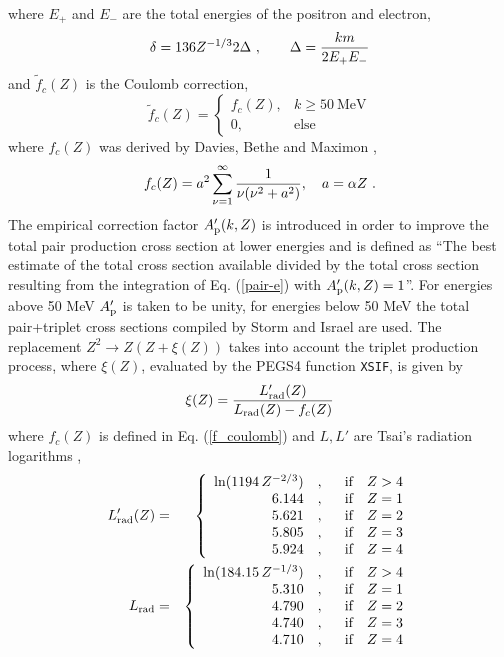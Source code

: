 where $E_+$ and $E_-$ are the total energies of the 
positron and electron, 
\begin{equation}
\delta = 136 Z^{-1/3} 2 \Delta~,\quad \quad \Delta = {k m \over 2 E_+ E_-}
\end{equation}
and $\tilde{f}_c(Z)$ is the Coulomb correction,
\begin{equation}
\label{f_coulomb}
\tilde{f}_c(Z) =  
\begin{cases}
f_c(Z), & k \ge 50~\text{MeV} \\
0, & \text{else}
\end{cases}
\end{equation}
where $f_c(Z)$ was derived by 
Davies, Bethe and Maximon \cite{Da54},
\begin{equation}
\label{f_coulomb1}
f_c(Z) = a^2 \sum_{\nu=1}^\infty {1 \over \nu (\nu^2 + a^2)}, \quad 
a = \alpha Z~.
\end{equation} 
The empirical correction factor $A_{\rm p}'(k,Z)$ is 
introduced in order to improve the total pair production 
cross section at lower energies and is defined 
as ``The best estimate of the total cross section 
available divided by the total cross section resulting 
from the integration of Eq. (\ref{pair-e}) with 
$A_{\rm p}'(k,Z)=1$''. For energies above 
50 MeV $A_{\rm p}'$ is taken to be unity, for 
energies below 50 MeV the total pair+triplet cross sections compiled 
by Storm and Israel \cite{SI70} are used.
The replacement $Z^2 \to Z (Z + \xi(Z))$ takes 
into account the triplet production process, where $\xi(Z)$, 
evaluated by the PEGS4 function {\tt XSIF},  is given by 
\begin{equation}
\xi(Z) = {L_{\rm rad}'(Z) \over L_{\rm rad}(Z) - f_c(Z)}
\end{equation}
where $f_c(Z)$ is defined in Eq. (\ref{f_coulomb}) and 
$L,L'$ are Tsai's radiation logarithms \cite{Ts74},
\begin{eqnarray}
L_{\rm rad}'(Z) & = & 
\left\{
\begin{array}{r@{\quad , \quad}l}
\ln(1194\,Z^{-2/3}) &~~\mbox{if}~~~Z > 4 \\
6.144 & ~~\mbox{if}~~~Z = 1 \\
5.621 & ~~\mbox{if}~~~Z = 2 \\
5.805 & ~~\mbox{if}~~~Z = 3 \\
5.924 & ~~\mbox{if}~~~Z = 4
\end{array} \right. \nonumber \\
L_{\rm rad} & = & 
\left\{
\begin{array}{r@{\quad , \quad}l}
\ln(184.15\,Z^{-1/3}) &~~\mbox{if}~~~Z > 4 \\
5.310 & ~~\mbox{if}~~~Z = 1 \\
4.790 & ~~\mbox{if}~~~Z = 2 \\
4.740 & ~~\mbox{if}~~~Z = 3 \\
4.710 & ~~\mbox{if}~~~Z = 4 
\end{array} \right.
\end{eqnarray}

